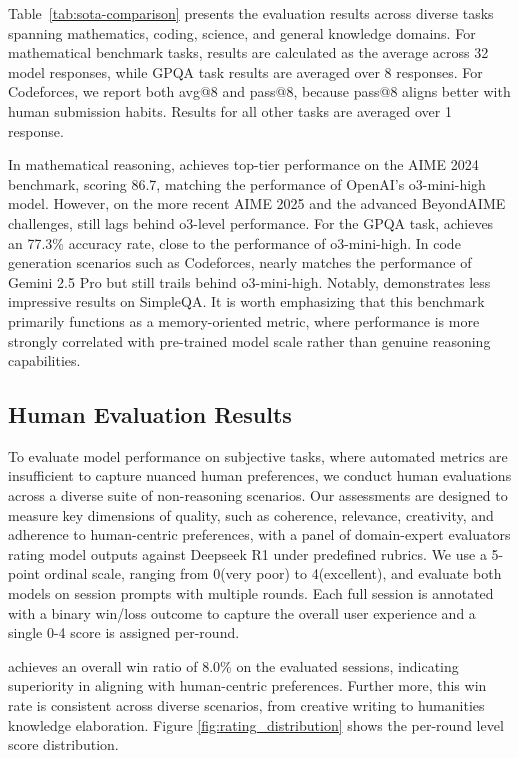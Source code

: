 Table~\ref{tab:sota-comparison} presents the evaluation results across diverse tasks spanning mathematics, coding, science, and general knowledge domains. For mathematical benchmark tasks, results are calculated as the average across 32 model responses, while GPQA task results are averaged over 8 responses. For Codeforces, we report both avg@8 and pass@8, because pass@8 aligns better with human submission habits. Results for all other tasks are averaged over 1 response.

In mathematical reasoning, \method achieves top-tier performance on the AIME 2024 benchmark, scoring 86.7, matching the performance of OpenAI's o3-mini-high model. However, on the more recent AIME 2025 and the advanced BeyondAIME challenges, \method still lags behind o3-level performance. For the GPQA task, \method achieves an 77.3\% accuracy rate, close to the performance of o3-mini-high. In code generation scenarios such as Codeforces, \method nearly matches the performance of Gemini 2.5 Pro but still trails behind o3-mini-high. 
Notably, \method demonstrates less impressive results on SimpleQA. It is worth emphasizing that this benchmark primarily functions as a memory-oriented metric, where performance is more strongly correlated with pre-trained model scale rather than genuine reasoning capabilities.

\subsection{Human Evaluation Results}
To evaluate model performance on subjective tasks, where automated metrics are insufficient to capture nuanced human preferences, we conduct human evaluations across a diverse suite of non-reasoning scenarios. Our assessments are designed to measure key dimensions of quality, such as coherence, relevance, creativity, and adherence to human-centric preferences, with a panel of domain-expert evaluators rating model outputs against Deepseek R1 under predefined rubrics. We use a 5-point ordinal scale, ranging from 0(very poor) to 4(excellent), and evaluate both models on session prompts with multiple rounds. Each full session is annotated with a binary win/loss outcome to capture the overall user experience and a single 0-4 score is assigned per-round.

\method achieves an overall win ratio of 8.0\% on the evaluated sessions, indicating superiority in aligning with human-centric preferences. Further more, this win rate is consistent across diverse scenarios, from creative writing to humanities knowledge elaboration. Figure \ref{fig:rating_distribution} shows the per-round level score distribution.

